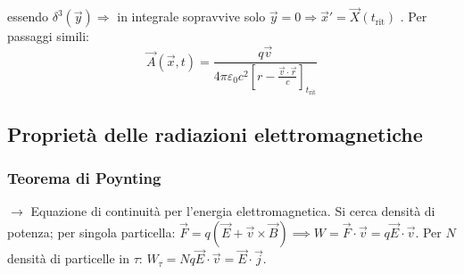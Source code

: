\documentclass[a4paper]{scrartcl}
\numberwithin{equation}{subsection}
\theoremstyle{style1}
\begin{document}
essendo $\delta ^3(\vec{y}) \Rightarrow $ in integrale sopravvive solo $\vec{y}=0\Rightarrow \vec{x}' = \vec{X}(t_\text{rit})$ . Per passaggi simili:
\begin{equation}
	\vec{A}(\vec{x},t) = \frac{q\vec{v}}{4\pi \varepsilon _0 c^2 \left[ r - \frac{\vec{v}\cdot \vec{r}}{c} \right] _{t_\text{rit}} }
\end{equation}



















\subsection{Propriet\`a delle radiazioni elettromagnetiche}
\subsubsection{Teorema di Poynting}
$\to$ Equazione di continuit\`a per l'energia elettromagnetica. Si cerca densit\`a di potenza; per singola particella: $\vec{F}=q (\vec{E}+\vec{v}\times \vec{B})\implies W = \vec{F}\cdot \vec{v}= q \vec{E}\cdot \vec{v}$. Per $N$ densit\`a di particelle in $\tau $: $W_\tau  = Nq\vec{E}\cdot \vec{v} = \vec{E}\cdot \vec{j}$. 
\end{document}
